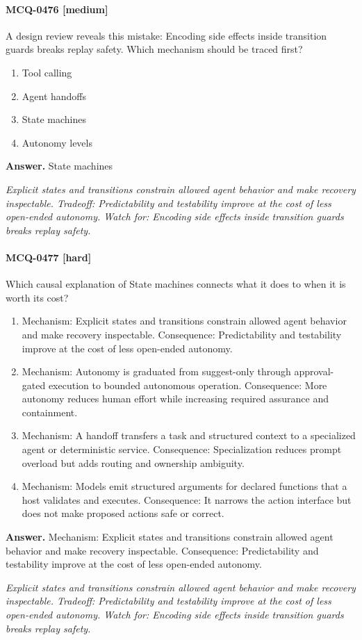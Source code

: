 \paragraph{MCQ-0476 [medium]} A design review reveals this mistake: Encoding side effects inside transition guards breaks replay safety. Which mechanism should be traced first?
\begin{enumerate}[label=\Alph*.]
\item Tool calling
\item Agent handoffs
\item State machines
\item Autonomy levels
\end{enumerate}
\noindent\textbf{Answer.} State machines
\par\textit{Explicit states and transitions constrain allowed agent behavior and make recovery inspectable. Tradeoff: Predictability and testability improve at the cost of less open-ended autonomy. Watch for: Encoding side effects inside transition guards breaks replay safety.}
\paragraph{MCQ-0477 [hard]} Which causal explanation of State machines connects what it does to when it is worth its cost?
\begin{enumerate}[label=\Alph*.]
\item Mechanism: Explicit states and transitions constrain allowed agent behavior and make recovery inspectable. Consequence: Predictability and testability improve at the cost of less open-ended autonomy.
\item Mechanism: Autonomy is graduated from suggest-only through approval-gated execution to bounded autonomous operation. Consequence: More autonomy reduces human effort while increasing required assurance and containment.
\item Mechanism: A handoff transfers a task and structured context to a specialized agent or deterministic service. Consequence: Specialization reduces prompt overload but adds routing and ownership ambiguity.
\item Mechanism: Models emit structured arguments for declared functions that a host validates and executes. Consequence: It narrows the action interface but does not make proposed actions safe or correct.
\end{enumerate}
\noindent\textbf{Answer.} Mechanism: Explicit states and transitions constrain allowed agent behavior and make recovery inspectable. Consequence: Predictability and testability improve at the cost of less open-ended autonomy.
\par\textit{Explicit states and transitions constrain allowed agent behavior and make recovery inspectable. Tradeoff: Predictability and testability improve at the cost of less open-ended autonomy. Watch for: Encoding side effects inside transition guards breaks replay safety.}
